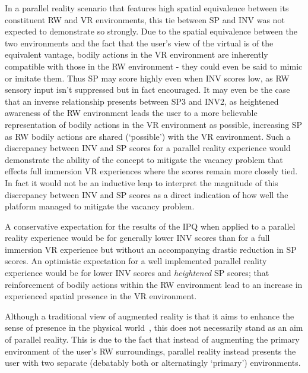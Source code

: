 In a parallel reality scenario that features high spatial equivalence between its constituent RW and VR environments, this tie between SP and INV was not expected to demonstrate so strongly. Due to the spatial equivalence between the two environments and the fact that the user's view of the virtual is of the equivalent vantage, bodily actions in the VR environment are inherently compatible with those in the RW environment - they could even be said to mimic or imitate them. Thus SP may score highly even when INV scores low, as RW sensory input isn't suppressed but in fact encouraged. It may even be the case that an inverse relationship presents between SP3 and INV2, as heightened awareness of the RW environment leads the user to a more believable representation of bodily actions in the VR environment as possible, increasing SP as RW bodily actions are shared (`possible') with the VR environment. Such a discrepancy between INV and SP scores for a parallel reality experience would demonstrate the ability of the concept to mitigate the vacancy problem that effects full immersion VR experiences where the scores remain more closely tied. In fact it would not be an inductive leap to interpret the magnitude of this discrepancy between INV and SP scores as a direct indication of how well the platform managed to mitigate the vacancy problem.

A conservative expectation for the results of the IPQ when applied to a parallel reality experience would be for generally lower INV scores than for a full immersion VR experience but without an accompanying drastic reduction in SP scores. An optimistic expectation for a well implemented parallel reality experience would be for lower INV scores and \textit{heightened} SP scores; that reinforcement of bodily actions within the RW environment lead to an increase in experienced spatial presence in the VR environment.

Although a traditional view of augmented reality is that it aims to enhance the sense of presence in the physical world~\cite{Waterworth2014}, this does not necessarily stand as an aim of parallel reality. This is due to the fact that instead of augmenting the primary environment of the user's RW surroundings, parallel reality instead presents the user with two separate (debatably both or alternatingly `primary') environments.



